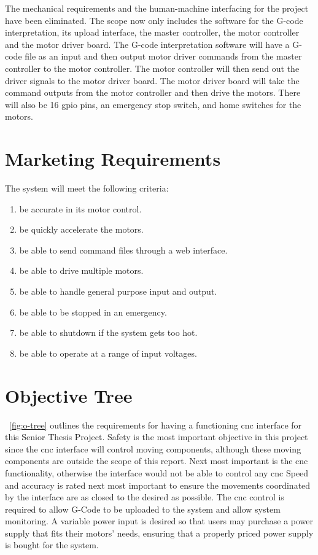 The mechanical requirements and the human-machine interfacing for the project have been eliminated.
The scope now only includes the software for the G-code interpretation, its upload interface, the master controller, the motor controller and the motor driver board.
The G-code interpretation software will have a G-code file as an input and then output motor driver commands from the master controller to the motor controller.
The motor controller will then send out the driver signals to the motor driver board. 
The motor driver board will take the command outputs from the motor controller and then drive the motors. 
There will also be 16 \gls{gpio} pins, an emergency stop switch, and home switches for the motors. 

\section{Marketing Requirements}
The system will meet the following criteria:
\begin{enumerate} \parskip2pt
	\item be accurate in its motor control.
	\item be quickly accelerate the motors.
	\item be able to send command files through a web interface.
	\item be able to drive multiple motors.
	\item be able to handle general purpose input and output.
	\item be able to be stopped in an emergency.
	\item be able to shutdown if the system gets too hot. 
	\item be able to operate at a range of input voltages.
\end{enumerate}

\section{Objective Tree}
~\ref{fig:o-tree} outlines the requirements for having a functioning \gls{cnc} interface for this Senior Thesis Project.
Safety is the most important objective in this project since the \gls{cnc} interface will control moving components, although these moving components are outside the scope of this report.
Next most important is the \gls{cnc} functionality, otherwise the interface would not be able to control any \gls{cnc}
Speed and accuracy is rated next most important to ensure the movements coordinated by the interface are as closed to the desired as possible.
The \gls{cnc} control is required to allow G-Code to be uploaded to the system and allow system monitoring.
A variable power input is desired so that users may purchase a power supply that fits their motors' needs, ensuring that a properly priced power supply is bought for the system.

